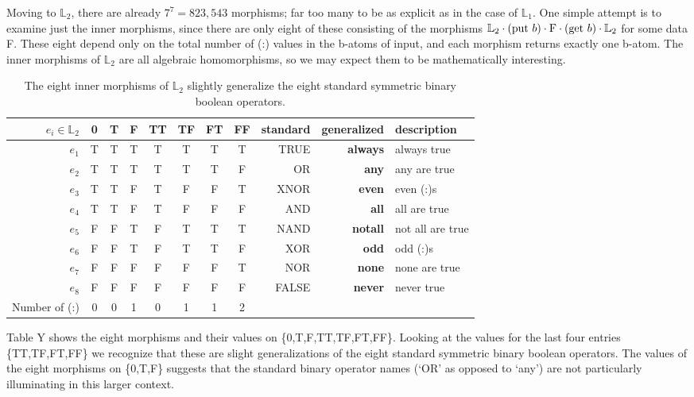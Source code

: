 \documentclass[11pt]{article}
\begin{document}
    Moving to ${\mathbb L}_2$, there are already $7^7=823,543$ morphisms; far too many to be as explicit as in the case of ${\mathbb L}_1$.  One simple attempt is to examine just the inner morphisms, since there are only eight of these consisting of 
 the morphisms ${\mathbb L}_2\cdot ({\rm put}\ b)\cdot {\rm F} \cdot ({\rm get}\ b) \cdot {\mathbb L}_2$
for some data F.  These eight depend only on the total number of (:) values in the b-atoms of input, and each morphism returns exactly one b-atom.  
The inner morphisms of ${\mathbb L}_2$ are all algebraic homomorphisms, so we may expect them to be
mathematically interesting.   

\begin{table}
\caption{The eight inner morphisms of ${\mathbb L}_2$ slightly generalize the eight standard symmetric binary boolean operators.}
\centering 
\begin{tabular}{r c c c c c c c r r l}
\hline\hline
$e_i \in {\mathbb L}_2$ & 0 & T & F & TT & TF & FT & FF & standard & generalized & description \\ [0.5ex] 
\hline
$e_1$  & T & T & T & T & T & T & T & TRUE & {\bf always} & always true \\
$e_2$  & T & T & T & T & T & T & F & OR & {\bf any} & any are true \\
$e_3$  & T & T & F & T & F & F & T & XNOR & {\bf even} & even (:)s \\
$e_4$ & T & T & F & T & F & F & F & AND & {\bf all} & all are true \\
$e_5$ & F & F & T & F & T & T & T & NAND & {\bf notall} & not all are true \\
$e_6$ & F & F & T & F & T & T & F & XOR & {\bf odd} & odd (:)s \\
$e_7$ & F & F & F & F & F & F & T & NOR & {\bf none} & none are true  \\
$e_8$ & F & F & F & F & F & F & F & FALSE & {\bf never} & never true \\
\hline
Number of (:)   & 0 & 0 & 1 & 0 & 1 & 1 & 2 &  \\ 
\hline
\end{tabular}
\label{table:L2}
\end{table} 

Table Y shows the eight morphisms and their values on \{0,T,F,TT,TF,FT,FF\}.  Looking at the values for the last four entries \{TT,TF,FT,FF\} 
we recognize that these are slight generalizations of the eight standard symmetric binary boolean operators.  The values of the eight morphisms 
on \{0,T,F\} suggests that the standard binary operator names (`OR' as opposed to `any') are not particularly illuminating in this larger context.  
\end{document}
